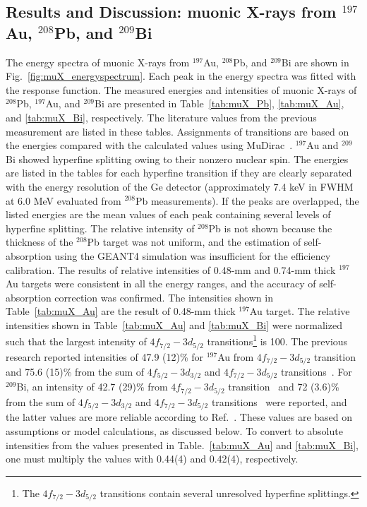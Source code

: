 \subsection{Results and Discussion: muonic X-rays from $^{197}$Au, $^{208}$Pb, and $^{209}$Bi}
The energy spectra of muonic X-rays from $^{197}$Au, $^{208}$Pb, and $^{209}$Bi are shown in Fig.~\ref{fig:muX_energyspectrum}. 
Each peak in the energy spectra was fitted with the response function.
The measured energies and intensities of muonic X-rays of $^{208}$Pb, $^{197}$Au, and $^{209}$Bi are presented in Table~\ref{tab:muX_Pb}, \ref{tab:muX_Au}, and \ref{tab:muX_Bi}, respectively.
The literature values from the previous measurement are listed in these tables. 
Assignments of transitions are based on the energies compared with the calculated values using MuDirac~\cite{Sturniolo2021-kw}. %
$^{197}$Au and $^{209}$Bi showed hyperfine splitting owing to their nonzero nuclear spin.
The energies are listed in the tables for each hyperfine transition if they are clearly separated with the energy resolution of the Ge detector (approximately 7.4 keV in FWHM at 6.0 MeV evaluated from $^{208}$Pb measurements).
If the peaks are overlapped, the listed energies are the mean values of each peak containing several levels of hyperfine splitting.
The relative intensity of $^{208}$Pb is not shown because the thickness of the $^{208}$Pb target was not uniform, and the estimation of self-absorption using the GEANT4 simulation was insufficient for the efficiency calibration. 
The results of relative intensities of 0.48-mm and 0.74-mm thick $^{197}$Au targets were consistent in all the energy ranges, and the accuracy of self-absorption correction was confirmed. The intensities shown in Table~\ref{tab:muX_Au} are the result of 0.48-mm thick $^{197}$Au target. 
The relative intensities shown in Table~\ref{tab:muX_Au} and \ref{tab:muX_Bi} were normalized such that the largest intensity of $4f_{7/2}-3d_{5/2}$ transitions\footnote{The $4f_{7/2}-3d_{5/2}$ transitions contain several unresolved hyperfine splittings.} is 100.
The previous research reported intensities of 47.9 (12)\% for $^{197}$Au from $4f_{7/2}-3d_{5/2}$ transition~\cite{Measday2007-zh} and 75.6 (15)\% from the sum of $4f_{5/2}-3d_{3/2}$ and $4f_{7/2}-3d_{5/2}$ transitions~\cite{Hartmann1982-wi}.
For $^{209}$Bi, an intensity of 42.7 (29)\% from $4f_{7/2}-3d_{5/2}$ transition~\cite{Measday2007-zh} and 
72 (3.6)\% from the sum of $4f_{5/2}-3d_{3/2}$ and $4f_{7/2}-3d_{5/2}$ transitions~\cite{Backenstoss1970-wj} were reported, and the latter values are more reliable according to Ref.~\cite{Measday2007-zh}. 
These values are based on assumptions or model calculations, as discussed below. 
To convert to absolute intensities from the values presented in Table.~\ref{tab:muX_Au} and \ref{tab:muX_Bi}, one must multiply the values with 0.44(4) and 0.42(4), respectively.


